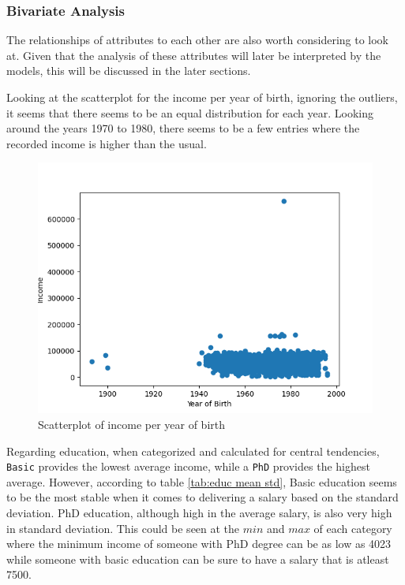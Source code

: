 
\subsubsection{Bivariate Analysis}

The relationships of attributes to each other are also worth considering to look at. Given that the analysis of these attributes will later be interpreted by the models, this will be discussed in the later sections.

Looking at the scatterplot for the income per year of birth, ignoring the outliers, it seems that there seems to be an equal distribution for each year. Looking around the years 1970 to 1980, there seems to be a few entries where the recorded income is higher than the usual. 

\begin{figure}[H]
    \centering
    \includegraphics[width=\linewidth]{figures/income_per_yob.png}
    \caption{Scatterplot of income per year of birth}
\end{figure}

Regarding education, when categorized and calculated for central tendencies, \texttt{Basic} provides the lowest average income, while a \texttt{PhD} provides the highest average. However, according to table \ref{tab:educ mean std}, Basic education seems to be the most stable when it comes to delivering a salary based on the standard deviation. PhD education, although high in the average salary, is also very high in standard deviation. This could be seen at the $min$ and $max$ of each category where the minimum income of someone with PhD degree can be as low as 4023 while someone with basic education can be sure to have a salary that is atleast 7500.

